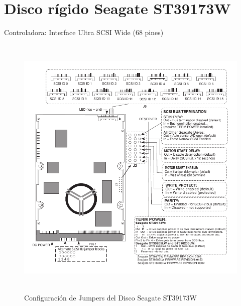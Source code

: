 \documentclass[a4paper]{article}
\begin{document}
%
\sffamily
%
\maketitle
%
% 
\section{Disco rígido Seagate ST39173W}
Controladora: Interface Ultra SCSI Wide (68 pines)
\begin{figure}[H] \begin{center}
\includegraphics[height=130mm]{imgs/st39173w_pines} 
\caption{Configuración de Jumpers del Disco Seagate ST39173W}
\end{center}
\end{figure}
%
\end{document}
